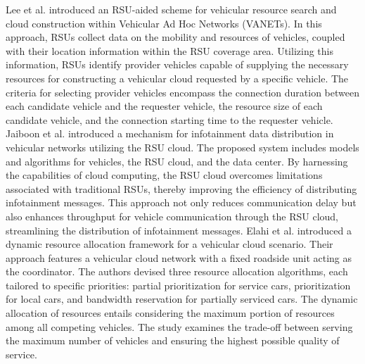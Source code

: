 \documentclass[sensors,article,accept,moreauthors,pdftex]{Definitions/mdpi}
\begin{document}
Lee et al. \cite{Lee2019} introduced an RSU-aided scheme for vehicular resource search and cloud construction within Vehicular Ad Hoc Networks (VANETs). In this approach, RSUs collect data on the mobility and resources of vehicles, coupled with their location information within the RSU coverage area. Utilizing this information, RSUs identify provider vehicles capable of supplying the necessary resources for constructing a vehicular cloud requested by a specific vehicle. The criteria for selecting provider vehicles encompass the connection duration between each candidate vehicle and the requester vehicle, the resource size of each candidate vehicle, and the connection starting time to the requester vehicle.
\linebreak  Jaiboon et al. \cite{Jaiboon2017} introduced a mechanism for infotainment data distribution in vehicular networks utilizing the RSU cloud. The proposed system includes models and algorithms for vehicles, the RSU cloud, and the data center. By harnessing the capabilities of cloud computing, the RSU cloud overcomes limitations associated with traditional RSUs, thereby improving the efficiency of distributing infotainment messages. This approach not only reduces communication delay but also enhances throughput for vehicle communication through the RSU cloud, streamlining the distribution of infotainment messages.
\linebreak  Elahi et al. \cite{Elahi2021} introduced a dynamic resource allocation framework for a vehicular cloud scenario. Their approach features a vehicular cloud network with a fixed roadside unit acting as the coordinator. The authors devised three resource allocation algorithms, each tailored to specific priorities: partial prioritization for service cars, prioritization for local cars, and bandwidth reservation for partially serviced cars. The dynamic allocation of resources entails considering the maximum portion of resources among all competing vehicles. The study examines the trade-off between serving the maximum number of vehicles and ensuring the highest possible quality of service.
\end{document}
